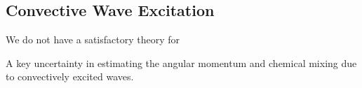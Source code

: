 {\color{purple}
\subsection{Convective Wave Excitation}
}

We do not have a satisfactory theory for 

A key uncertainty in estimating the angular momentum and chemical mixing due to convectively excited waves.
